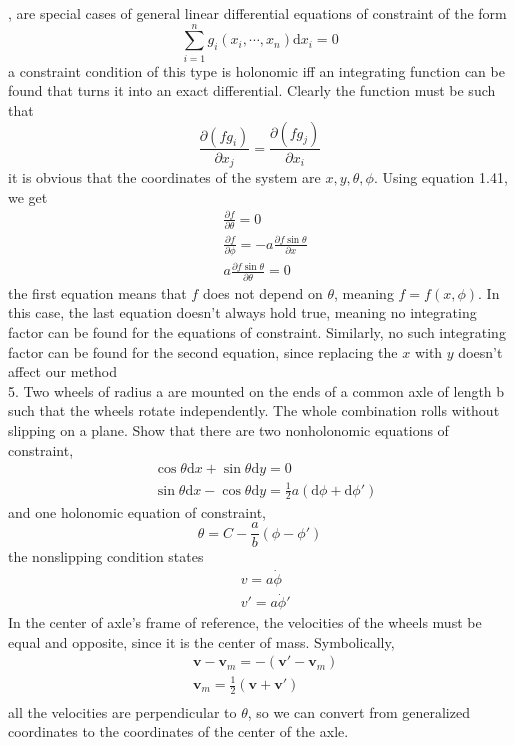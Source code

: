 \documentclass[]{article}
\numberwithin{equation}{section}
\begin{document}
, are special cases of general linear differential equations of constraint of the form 
$$\sum^n_{i=1}g_i(x_i,\cdots,x_n)\mathrm dx_i=0$$
a constraint condition of this type is holonomic iff an integrating function can be found that turns it into an exact differential. Clearly the function must be such that
\begin{equation}\frac{\partial(fg_i)}{\partial x_j}=\frac{\partial(fg_j)}{\partial x_i}\end{equation}
it is obvious that the coordinates of the system are $x,y,\theta,\phi$. Using equation 1.41, we get 
\begin{align*}
	&\frac{\partial f}{\partial\theta}=0\\
	&\frac{\partial f}{\partial\phi}=-a\frac{\partial f\sin\theta}{\partial x}\\
	&a\frac{\partial f\sin\theta}{\partial\theta}=0
\end{align*}
the first equation means that $f$ does not depend on $\theta$, meaning $f=f(x,\phi)$. In this case, the last equation doesn't always hold true, meaning no integrating factor can be found for the equations of constraint. Similarly, no such integrating factor can be found for the second equation, since replacing the $x$ with $y$ doesn't affect our method\\
5. Two wheels of radius a are mounted on the ends of a common axle of length b such that the wheels rotate independently. The whole combination rolls without slipping on a plane. Show that there are two nonholonomic equations of constraint,
\begin{align*}
	&\cos\theta\mathrm dx+\sin\theta\mathrm dy=0\\
	&\sin\theta\mathrm dx-\cos\theta\mathrm dy=\frac 12a(\mathrm d\phi+\mathrm d\phi')
\end{align*}
and one holonomic equation of constraint,
$$\theta=C-\frac ab(\phi-\phi')$$
the nonslipping condition states 
\begin{align*}
	&v=a\dot\phi\\
	&v'=a\dot\phi'
\end{align*}
In the center of axle's frame of reference, the velocities of the wheels must be equal and opposite, since it is the center of mass. Symbolically,
\begin{align*}
	&\mathbf v-\mathbf v_m=-(\mathbf v'-\mathbf v_m)\\
	&\mathbf v_m=\frac 12(\mathbf v+\mathbf v')\\
\end{align*}
all the velocities are perpendicular to $\theta$, so we can convert from generalized coordinates to the coordinates of the center of the axle.
\end{document}
